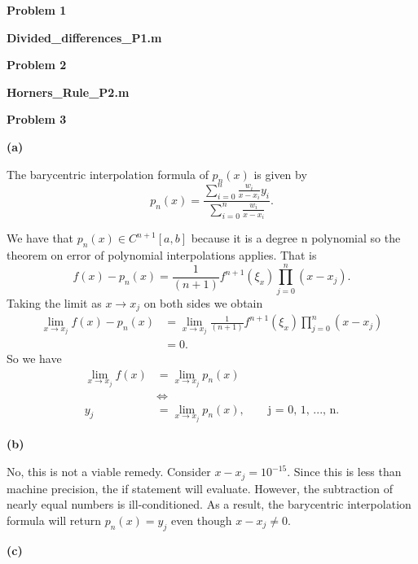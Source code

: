 \documentclass[final,12pt,reqno]{amsart}
\begin{document}
\thispagestyle{fancy}

\textbf{Problem 1}

\textbf{Divided\_differences\_P1.m}



\newpage

\textbf{Problem 2}

\textbf{Horners\_Rule\_P2.m}



\newpage

\textbf{Problem 3}

\textbf{(a)}

The barycentric interpolation formula of $p_n(x)$ is given by
\[
	p_n(x) = \frac{\sum_{i=0}^{n} \frac{w_i}{x-x_i}y_i}{\sum_{i=0}^{n} \frac{w_i}{x-x_i}}.
\]

We have that $p_n(x) \in C^{n+1}\left[a, b\right]$ because it is a degree n polynomial so the theorem on error of polynomial interpolations applies. That is
\[
	f(x) - p_n(x) = \frac{1}{(n+1)\!}f^{n+1}(\xi_x)\prod_{j=0}^{n}(x-x_j).
\]
Taking the limit as $x \rightarrow x_j$ on both sides we obtain
\begin{align*}
	\lim_{x \to x_j} f(x) - p_n(x) &= \lim_{x \to x_j} \frac{1}{(n+1)\!}f^{n+1}(\xi_x)\prod_{j=0}^{n}(x-x_j)\\
																 &= 0.
\end{align*}
So we have
\begin{align*}
	\lim_{x \to x_j} f(x) &= \lim_{x \to x_j} p_n(x)\\
												&\Leftrightarrow\\
	y_j &= \lim_{x \to x_j} p_n(x), \qquad \text{j = 0, 1, ..., n}.
\end{align*}

\textbf{(b)}

No, this is not a viable remedy. Consider $x - x_j = 10^{-15}$. Since this is less than machine precision, the if statement will evaluate. However, the subtraction of nearly equal numbers is ill-conditioned. As a result, the barycentric interpolation formula will return $p_n(x) = y_j$ even though $x - x_j \neq 0$.

\textbf{(c)}
\end{document}
